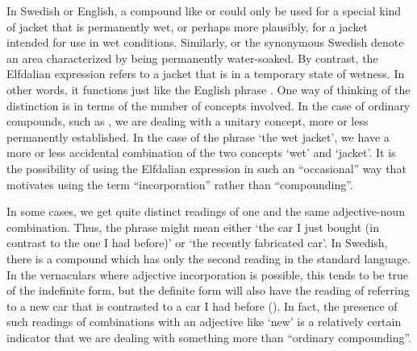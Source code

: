 In Swedish or English, a compound like  or  could only be used for a special kind of jacket that is permanently wet, or perhaps more plausibly, for a jacket intended for use in wet conditions. Similarly,  or the synonymous Swedish  denote an area characterized by being permanently water-soaked. By contrast, the Elfdalian expression refers to a jacket that is in a temporary state of wetness. In other words, it functions just like the English phrase . One way of thinking of the distinction is in terms of the number of concepts involved. In the case of ordinary compounds, such as , we are dealing with a unitary concept, more or less permanently established. In the case of the phrase ‘the wet jacket’, we have a more or less accidental combination of the two concepts ‘wet’ and ‘jacket’. It is the possibility of using the Elfdalian expression in such an “occasional” way that motivates using the term “incorporation” rather than “compounding”. 

In some cases, we get quite distinct readings of one and the same adjective-noun combination. Thus, the phrase  might mean either ‘the car I just bought (in contrast to the one I had before)’ or ‘the recently fabricated car’. In Swedish, there is a compound  which has only the second reading in the standard language. In the vernaculars where adjective incorporation is possible, this tends to be true of the indefinite form, but the definite form will also have the reading of referring to a new car that is contrasted to a car I had before (\citet[91]{SandströmEtAl2003}). In fact, the presence of such readings of combinations with an adjective like ‘new’ is a relatively certain indicator that we are dealing with something more than “ordinary compounding”.

